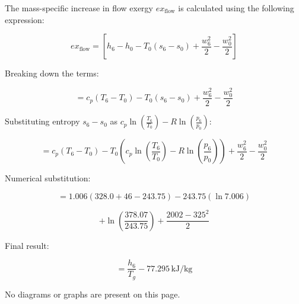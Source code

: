 The mass-specific increase in flow exergy \( ex_{\text{flow}} \) is calculated using the following expression:  

\[
ex_{\text{flow}} = \left[ h_6 - h_0 - T_0 (s_6 - s_0) + \frac{w_6^2}{2} - \frac{w_0^2}{2} \right]
\]

Breaking down the terms:  

\[
= c_p (T_6 - T_0) - T_0 (s_6 - s_0) + \frac{w_6^2}{2} - \frac{w_0^2}{2}
\]

Substituting entropy \( s_6 - s_0 \) as \( c_p \ln \left( \frac{T_6}{T_0} \right) - R \ln \left( \frac{p_6}{p_0} \right) \):  

\[
= c_p (T_6 - T_0) - T_0 \left( c_p \ln \left( \frac{T_6}{T_0} \right) - R \ln \left( \frac{p_6}{p_0} \right) \right) + \frac{w_6^2}{2} - \frac{w_0^2}{2}
\]

Numerical substitution:  

\[
= 1.006 (328.0 + 46 - 243.75) - 243.75 \left( \ln 7.006 \right)
\]

\[
+ \ln \left( \frac{378.07}{243.75} \right) + \frac{2002 - 325^2}{2}
\]

Final result:  

\[
= \frac{h_6}{T_g} - 77.295 \, \text{kJ/kg}
\]  

No diagrams or graphs are present on this page.